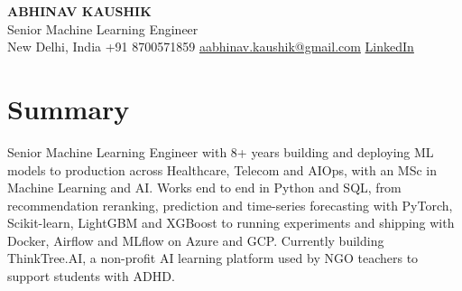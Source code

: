 \documentclass[10pt,a4paper]{article}
\begin{document}
\begin{center}
  {\LARGE\bfseries ABHINAV KAUSHIK}\\[2pt]
  {\large Senior Machine Learning Engineer}\\[2pt]
  New Delhi, India \textbar{} +91 8700571859 \textbar{} \href{mailto:aabhinav.kaushik@gmail.com}{aabhinav.kaushik@gmail.com} \textbar{} \href{https://www.linkedin.com/in/abhinav-kaushik10/}{LinkedIn}  
\end{center}

\section{Summary}
Senior Machine Learning Engineer with 8+ years building and deploying ML models to production across Healthcare, Telecom and AIOps, with an MSc in Machine Learning and AI. Works end to end in Python and SQL, from recommendation reranking, prediction and time-series forecasting with PyTorch, Scikit-learn, LightGBM and XGBoost to running experiments and shipping with Docker, Airflow and MLflow on Azure and GCP. Currently building ThinkTree.AI, a non-profit AI learning platform used by NGO teachers to support students with ADHD.
\end{document}
